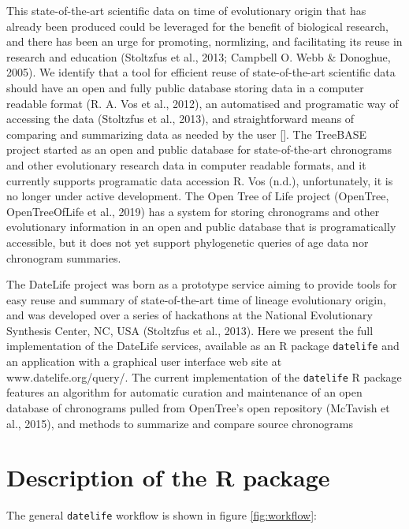 \documentclass[
  english,
  man]{apa6}
\begin{document}
This state-of-the-art scientific data on time of evolutionary origin that has already been produced could be leveraged for the benefit of biological research, and there has been an urge for promoting, normlizing, and facilitating its reuse in research and education (Stoltzfus et al., 2013; Campbell O. Webb \& Donoghue, 2005).
We identify that a tool for efficient reuse of state-of-the-art scientific data should have an open and fully public database storing data in a computer readable format (R. A. Vos et al., 2012), an automatised and programatic way of accessing the data (Stoltzfus et al., 2013), and straightforward means of comparing and summarizing data as needed by the user {[}{]}.
The TreeBASE project started as an open and public database for state-of-the-art chronograms and other evolutionary research data in computer readable formats, and it currently supports programatic data accession R. Vos (n.d.), unfortunately, it is no longer under active development.
The Open Tree of Life project (OpenTree, OpenTreeOfLife et al., 2019) has a system for storing chronograms and other evolutionary information in an open and public database that is programatically accessible, but it does not yet support phylogenetic queries of age data nor chronogram summaries.

The DateLife project was born as a prototype service aiming to provide tools for easy reuse and summary of state-of-the-art time of lineage evolutionary origin, and was developed over a series of hackathons at the National Evolutionary Synthesis Center, NC, USA (Stoltzfus et al., 2013).
Here we present the full implementation of the DateLife services, available as an R package \texttt{datelife} and an application with a graphical user interface web site at www.datelife.org/query/.
The current implementation of the \texttt{datelife} R package features an algorithm for automatic curation and maintenance of an open database of chronograms pulled from OpenTree's open repository (McTavish et al., 2015), and methods to summarize and compare source chronograms

\hypertarget{description-of-the-r-package}{%
\section{Description of the R package}\label{description-of-the-r-package}}

The general \texttt{datelife} workflow is shown in figure \ref{fig:workflow}:
\end{document}
